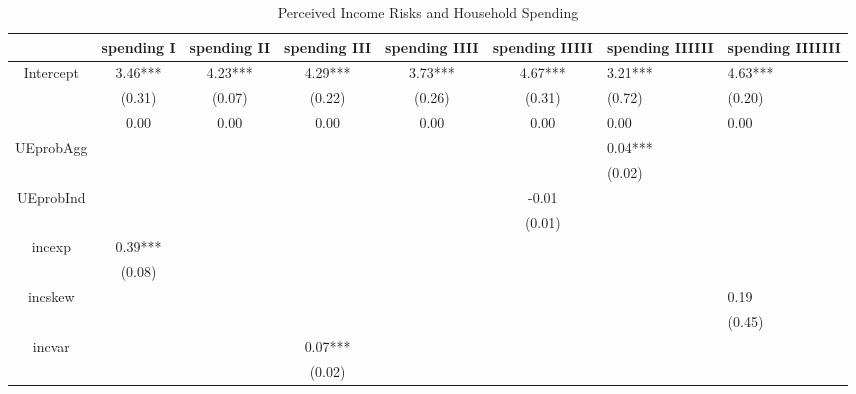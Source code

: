 \documentclass[12pt,notitlepage,onecolumn,aps,pra]{article}
\begin{document}
\begin{table}[p]
\centering
\begin{adjustbox}{width={0.9\textwidth}}
\begin{threeparttable}
\caption{Perceived Income Risks and Household Spending}
\label{spending_reg}\begin{tabular}{ccccccll}
\toprule
{} & spending I & spending II & spending III & spending IIII & spending IIIII & spending IIIIII & spending IIIIIII \\
\midrule
Intercept &    3.46*** &     4.23*** &      4.29*** &       3.73*** &        4.67*** &         3.21*** &          4.63*** \\
          &     (0.31) &      (0.07) &       (0.22) &        (0.26) &         (0.31) &          (0.72) &           (0.20) \\
          &       0.00 &        0.00 &         0.00 &          0.00 &           0.00 &            0.00 &             0.00 \\
UEprobAgg &            &             &              &               &                &         0.04*** &                  \\
          &            &             &              &               &                &          (0.02) &                  \\
UEprobInd &            &             &              &               &          -0.01 &                 &                  \\
          &            &             &              &               &         (0.01) &                 &                  \\
incexp    &    0.39*** &             &              &               &                &                 &                  \\
          &     (0.08) &             &              &               &                &                 &                  \\
incskew   &            &             &              &               &                &                 &             0.19 \\
          &            &             &              &               &                &                 &           (0.45) \\
incvar    &            &             &      0.07*** &               &                &                 &                  \\
          &            &             &       (0.02) &               &                &                 &                  \\

\end{tabular}
\end{threeparttable}
\end{adjustbox}
\end{table}
\end{document}
